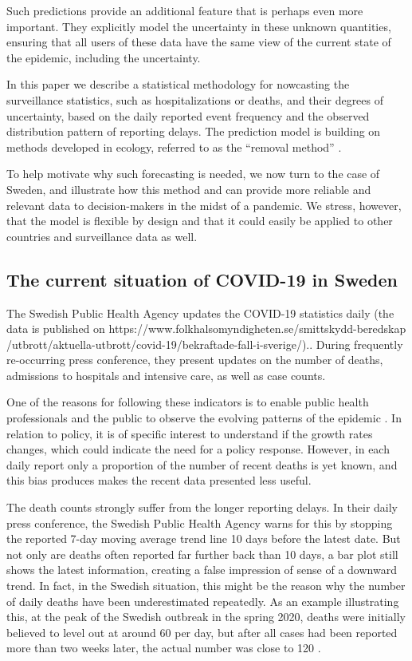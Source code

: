 \documentclass[a4paper,11pth]{article}
\begin{document}
Such predictions provide an additional feature that is perhaps even more important. They explicitly model the uncertainty in these unknown quantities, ensuring that all users of these data have the same view of the current state of the epidemic, including the uncertainty.

In this paper we describe a statistical methodology for nowcasting the surveillance statistics, such as hospitalizations or deaths, and their degrees of uncertainty, based on the daily reported event frequency and the observed distribution pattern of reporting delays. The prediction model is building on methods developed in ecology, referred to as the ``removal method'' \citep{Pollock1991_review_papers}.

To help motivate why such forecasting is needed, we now turn to the case of Sweden, and illustrate how this method and can provide more reliable and relevant data to decision-makers in the midst of a pandemic. We stress, however, that the model is flexible by design and that it could easily be applied to other countries and surveillance data as well.

\subsection{The current situation of COVID-19 in Sweden}
The Swedish Public Health Agency updates the COVID-19 statistics daily (the data is published on https://www.folkhalsomyndigheten.se/smittskydd-beredskap
/utbrott/aktuella-utbrott/covid-19/bekraftade-fall-i-sverige/).. During frequently re-occurring press conference, they present updates on the number of deaths, admissions to hospitals and intensive care, as well as case counts.

One of the reasons for following these indicators is to enable public health professionals and the public to observe the evolving patterns of the epidemic \citep{Anderson2020_how_will}. In relation to policy, it is of specific interest to understand if the growth rates changes, which could indicate the need for a policy response. However, in each daily report only a proportion of the number of recent deaths is yet known, and this bias produces makes the recent data presented less useful.

The death counts strongly suffer from the longer reporting delays. In their daily press conference, the Swedish Public Health Agency warns for this by stopping the reported 7-day moving average trend line 10 days before the latest date. But not only are deaths often reported far further back than 10 days, a bar plot still shows the latest information, creating a false impression of sense of a downward trend. In fact, in the Swedish situation, this might be the reason why the number of daily deaths have been underestimated repeatedly. As an example illustrating this, at the peak of the Swedish outbreak in the spring 2020, deaths were initially believed to level out at around 60 per day, but after all cases had been reported more than two weeks later, the actual number was close to 120 \citep{Ohman2020_antalet_virusdoda}.
\end{document}
